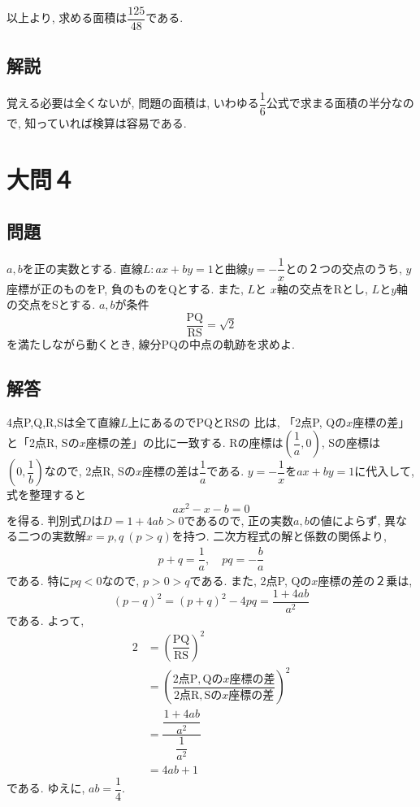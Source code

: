 \documentclass[dvipdfmx,a4paper]{jsarticle}
\newcommand{\2}{I\hspace{-1pt}I}
\newcommand{\3}{I\hspace{-1pt}I\hspace{-1pt}I}
\begin{document}
    以上より, 求める面積は$\dfrac{125}{48}$である. 

    \subsection{解説}
    覚える必要は全くないが, 問題の面積は, いわゆる$\dfrac{1}{6}$公式で求まる面積の半分なので, 
    知っていれば検算は容易である. 

    \section{大問４}
    \subsection{問題}
    $a,b$を正の実数とする. 直線$L: ax+by=1$と曲線$y=-\dfrac{1}{x}$との２つの交点のうち, 
    $y$座標が正のものをP, 負のものをQとする. また, $L$と
    $x$軸の交点をRとし, $L$と$y$軸の交点をSとする. $a,b$が条件
    \begin{equation*}\mathrm{
        \dfrac{PQ}{RS} = \sqrt{2}
    }
    \end{equation*}
    を満たしながら動くとき, 線分PQの中点の軌跡を求めよ. 

    \subsection{解答}
    4点P,Q,R,Sは全て直線$L$上にあるのでPQとRSの
    比は, 「2点P, Qの$x$座標の差」と「2点R, Sの$x$座標の差」の比に一致する. 
    Rの座標は$\left(\dfrac{1}{a},0\right)$, 
    Sの座標は$\left(0,\dfrac{1}{b}\right)$なので, 
    2点R, Sの$x$座標の差は$\dfrac{1}{a}$である. 
    $y=-\dfrac{1}{x}$を$ax+by=1$に代入して, 式を整理すると
    \begin{equation*}
        ax^2-x -b =0
    \end{equation*}
    を得る. 判別式$D$は$D=1 + 4ab >0$であるので, 正の実数$a,b$の値によらず, 
    異なる二つの実数解$x=p,q \ (p>q)$を持つ. 
    二次方程式の解と係数の関係より, 
    \begin{align*}
        p + q = \dfrac{1}{a}, \quad pq = -\dfrac{b}{a}
    \end{align*}
    である. 特に$pq<0$なので, $p>0>q$である. また, 2点P, Qの$x$座標の差の２乗は, 
    \[
        (p-q)^2 = (p+q)^2 - 4pq =\dfrac{1+4ab}{a^2}
    \]
    である. よって, 
    \begin{align*}
        2 &= \left(\dfrac{\mathrm{PQ}}{\mathrm{RS}} \right)^2 \\
        &= \left(\dfrac{\mathrm{2点P, Qの}x\mathrm{座標の差}}{\mathrm{2点R, Sの}x\mathrm{座標の差}} \right)^2 \\
        &= \dfrac{\dfrac{1+4ab}{a^2}}{\dfrac{1}{a^2}} \\
        &= 4ab + 1
    \end{align*}
    である. ゆえに, $ab=\dfrac{1}{4}$. 
\end{document}
